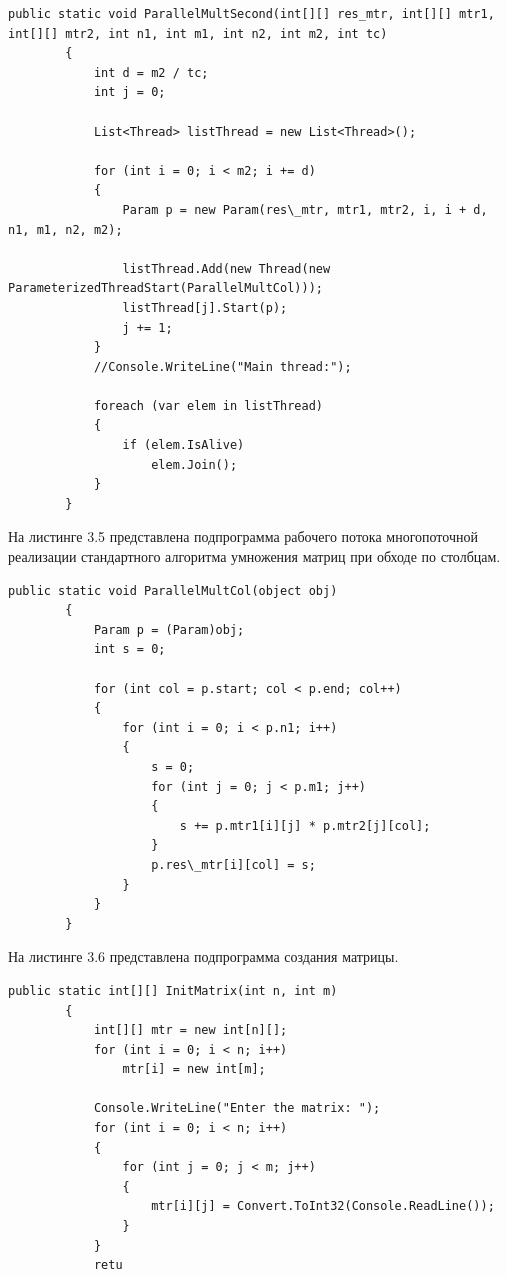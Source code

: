 \documentclass[12pt]{report}
\begin{document}
\begin{lstlisting}[label=some-code,caption= Подпрограмма главного потока многопоточной реализации стандартного алгоритма умножения матриц (обход по столбцам)]
public static void ParallelMultSecond(int[][] res_mtr, int[][] mtr1, int[][] mtr2, int n1, int m1, int n2, int m2, int tc)
        {
            int d = m2 / tc;
            int j = 0;

            List<Thread> listThread = new List<Thread>();

            for (int i = 0; i < m2; i += d)
            {
                Param p = new Param(res\_mtr, mtr1, mtr2, i, i + d, n1, m1, n2, m2);
                
                listThread.Add(new Thread(new ParameterizedThreadStart(ParallelMultCol)));
                listThread[j].Start(p); 
                j += 1;
            }
            //Console.WriteLine("Main thread:");

            foreach (var elem in listThread)
            {
                if (elem.IsAlive)
                    elem.Join();
            }
        }
\end{lstlisting}

На листинге 3.5 представлена подпрограмма рабочего потока многопоточной реализации стандартного алгоритма умножения матриц при обходе по столбцам.

\begin{lstlisting}[label=some-code,caption= Подпрограмма рабочего потока многопоточной реализации стандартного алгоритма умножения матриц (обход по столбцам)]
public static void ParallelMultCol(object obj)
        {
            Param p = (Param)obj;
            int s = 0;

            for (int col = p.start; col < p.end; col++)
            {
                for (int i = 0; i < p.n1; i++)
                {
                    s = 0;
                    for (int j = 0; j < p.m1; j++)
                    {
                        s += p.mtr1[i][j] * p.mtr2[j][col];
                    }
                    p.res\_mtr[i][col] = s;
                }
            }
        }
 \end{lstlisting}

На листинге 3.6 представлена подпрограмма создания матрицы.

\begin{lstlisting}[label=some-code,caption=Подпрограмма создания матрицы]
public static int[][] InitMatrix(int n, int m)
        {
            int[][] mtr = new int[n][];
            for (int i = 0; i < n; i++)
                mtr[i] = new int[m];

            Console.WriteLine("Enter the matrix: ");
            for (int i = 0; i < n; i++)
            {
                for (int j = 0; j < m; j++)
                {
                    mtr[i][j] = Convert.ToInt32(Console.ReadLine());
                }
            }
            retu

\end{lstlisting}
\end{document}
